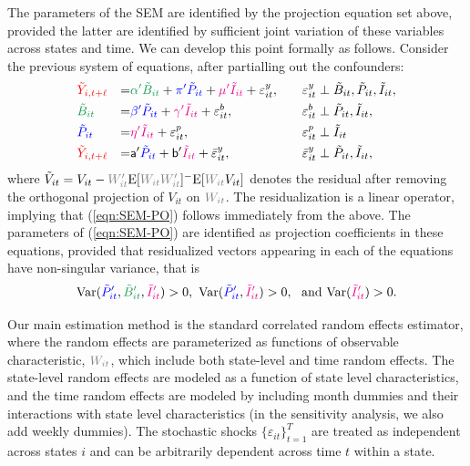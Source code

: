 \documentclass[3p, longtitle]{elsarticle}
\theoremstyle{definition}
\providecommand{\Var}{{\mathrm{Var}}}
\newcommand{\Ep}{{\mathrm{E}}}
\def\bcolor{\color{ForestGreen}}
\def\pcolor{\color{blue}}
\def\icolor{\color{magenta}}
\def\wcolor{\color{gray}}
\def\ycolor{\color{red}}
\begin{document}
The parameters of the SEM are identified by the projection equation set above, provided the latter are identified by sufficient joint variation of these variables across states and time. We can develop this point formally as follows. Consider the previous system of equations, after partialling out the confounders:
\begin{equation}\label{eqn:SEM-PO}
 \begin{aligned}
   & {\ycolor { \tilde Y_{i,t+\ell}}}  & =& {\bcolor {\alpha ' \tilde B_{it}}} +{\pcolor {\pi '\tilde P_{it}}} +{\icolor \mu'\tilde I_{it} } + \varepsilon^y_{it},&\varepsilon^y_{it} &\perp {\tilde B_{it}}, {\tilde  P_{it}}, { \tilde I_{it}},  \\
   & {\bcolor { \tilde B_{it}}} & = &{\pcolor { \beta' \tilde P_{it}} } + {\icolor { \gamma' \tilde I_{it}} } + \varepsilon^b_{it},
   &\quad \varepsilon^b_{it} &\perp { \tilde P_{it}}, { \tilde I_{it}},  \\
   & {\pcolor { \tilde P_{it}} } &= &  {\icolor {\eta' \tilde I_{it}} } +   \varepsilon^p_{it}, &\quad \varepsilon^p_{it} &\perp {\tilde I_{it}}  \\
     & {\ycolor { \tilde Y_{i,t+\ell}}}  & =&  \mathsf{a} ' {\pcolor {\tilde P_{it}}} + \mathsf{b}' {\icolor \tilde I_{it} } + \bar \varepsilon^y_{it},&\bar \varepsilon^y_{it} &\perp  {\tilde  P_{it}}, { \tilde I_{it}},  \\
   \end{aligned}
\end{equation}
where $ \tilde V_{it} = V_{it}   -     {\wcolor W_{it}'} \Ep[{\wcolor W_{it}W_{it}'}]^{-} \Ep[{\wcolor W_{it}} V_{it}]$ denotes
the residual after removing the orthogonal projection of $V_{it}$ on ${\wcolor W_{it}}$. The residualization is a linear operator, implying that (\ref{eqn:SEM-PO}) follows immediately from the above. The parameters of (\ref{eqn:SEM-PO})  are identified as projection coefficients in these equations, provided that residualized vectors appearing in each of the equations have non-singular variance, that is
 \begin{equation}
 \Var ( {\pcolor \tilde P_{it}'} ,{\bcolor \tilde B_{it}'},{\icolor \tilde I_{it}'})>0,
 \ \Var ({\pcolor \tilde P_{it}'}, {\icolor \tilde I_{it}'})> 0 , \ \text{ and  }  \Var ( {\icolor \tilde I_{it}'}) >0.
 \end{equation}

Our main estimation method is the standard correlated random effects estimator, where the random effects
are parameterized as functions of observable characteristic, ${\wcolor W_{it}}$, which include both state-level and time random effects.  The state-level random effects
are modeled as a function of state level characteristics, and the time random effects are modeled
by including month dummies and their interactions with state level characteristics (in the sensitivity analysis,
we also add weekly dummies).  The stochastic shocks $\{ \varepsilon_{it}\}_{t=1}^T$ are treated as independent across states $i$ and can be arbitrarily dependent across time $t$ within a state.
\end{document}
